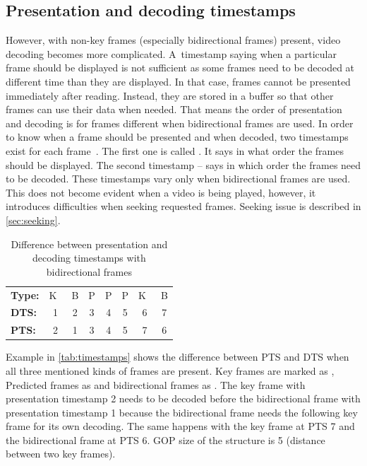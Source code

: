 \subsection{Presentation and decoding timestamps}\label{subs:timestamps}
However, with non-key frames (especially bidirectional frames) present, video decoding becomes more complicated. A~timestamp saying when a particular frame should be displayed is not sufficient as some frames need to be decoded at different time than they are displayed. In that case, frames cannot be presented immediately after reading. Instead, they are stored in a buffer so that other frames can use their data when needed. That means the order of presentation and decoding is for frames different when bidirectional frames are used. In order to know when a frame should be presented and when decoded, two timestamps exist for each frame~\cite{mpeg_timestamps}. The first one is called . It says in what order the frames should be displayed. The second timestamp –  says in which order the frames need to be decoded. These timestamps vary only when bidirectional frames are used.
This does not become evident when a video is being played, however, it introduces difficulties when seeking requested frames. Seeking issue is described in \autoref{sec:seeking}.

\begin{table}[h]
  \begin{center}
    \begin{tabular}{ l c  c  c  c  c  c c }
        \textbf{Type:} & K~& B & P & P & P & K~& B\\
        \textbf{DTS:} & 1 & 2 & 3 & 4 & 5 & 6 & 7\\
        \textbf{PTS:} & 2 & 1 & 3 & 4 & 5 & 7 & 6\\
    \end{tabular}
    \caption{Difference between presentation and decoding timestamps with bidirectional frames}
    \label{tab:timestamps}
  \end{center}
\end{table}


Example in \autoref{tab:timestamps} shows the difference between PTS and DTS when all three mentioned kinds of frames are present. Key frames are marked as , Predicted frames as  and bidirectional frames as . The key frame with presentation timestamp 2 needs to be decoded before the bidirectional frame with presentation timestamp 1 because the bidirectional frame needs the following key frame for its own decoding. The same happens with the key frame at PTS 7 and the bidirectional frame at PTS 6. GOP size of the structure is 5 (distance between two key frames).

